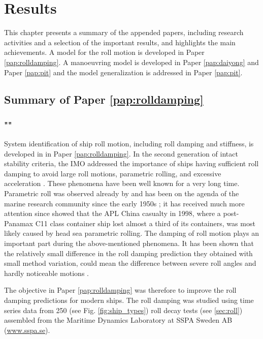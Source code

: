 \chapter{Results\label{ch:results}}
This chapter presents a summary of the appended papers, including research activities
and a selection of the important results, and highlights the main achievements. A model for the roll motion is developed in Paper \ref{pap:rolldamping}. A manoeuvring model is developed in Paper \ref{pap:daiyong} and Paper \ref{pap:pit} and the model generalization is addressed in Paper \ref{pap:pit}.

\section{Summary of Paper \ref{pap:rolldamping}}
\subsection*{""}
System identification of ship roll motion, including roll damping and stiffness, is developed in in Paper \ref{pap:rolldamping}. In the second generation of intact stability criteria, the IMO addressed the importance of ships having sufficient roll damping to avoid large roll motions, parametric rolling, and excessive acceleration \parencite{imo_finalization_2016}. These phenomena have been well known for a very long time. Parametric roll was observed already by \parencite{froude_rolling_1861} and has been on the agenda of the marine research community since the early 1950s \parencite{galeazzi_early_2013}; it has received much more attention since \parencite{france_investigation_2001} showed that the APL China casualty in 1998, where a post-Panamax C11 class container ship lost almost a third of its containers, was most likely caused by head sea parametric rolling. The damping of roll motion plays an important part during the above-mentioned phenomena. It has been shown that the relatively small difference in the roll damping prediction they obtained with small method variation, could mean the difference between severe roll angles and hardly noticeable motions \parencite{soder_ikeda_2019}.

The objective in Paper \ref{pap:rolldamping} was therefore to improve the roll damping predictions for modern ships. The roll damping was studied using time series data from 250 (see Fig. \ref{fig:ship_types}) roll decay tests (see \autoref{sec:roll}) assembled from the Maritime Dynamics Laboratory at SSPA Sweden AB (\href{www.sspa.se}{www.sspa.se}).

